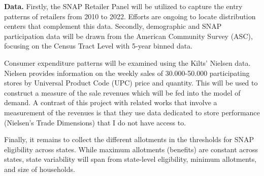 \documentclass[11pt]{article}
\begin{document}


\textbf{Data.} Firstly, the SNAP Retailer Panel will be utilized to capture the entry patterns of retailers from 2010 to 2022. Efforts are ongoing to locate distribution centers that complement this data. Secondly, demographic and SNAP participation data will be drawn from the American Community Survey (ASC), focusing on the Census Tract Level with 5-year binned data.

 Consumer expenditure patterns will be examined using the Kilts' Nielsen data.  Nielsen provides information on the weekly sales of 30.000-50.000 participating stores by Universal Product Code (UPC) price and quantity. This will be used to construct a measure of the sale revenues which will be fed into the model of demand. A contrast of this project with related works that involve a measurement of the revenues \cite{holmes2011diffusion,ellickson2020measuring,chenarides2024dynamic} is that they use data dedicated to store performance (Nielsen's Trade Dimensions) that I do not have access to.
 

 Finally, it remains to collect the different allotments in the thresholds for SNAP eligibility across states. While maximum allotments (benefits) are constant across states, state variability will span from state-level eligibility, minimum allotments, and size of households. 
\end{document}
